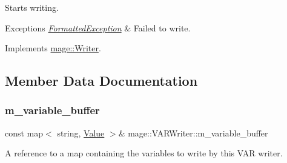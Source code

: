 Starts writing.


\begin{DoxyExceptions}{Exceptions}
{\em \hyperlink{classmage_1_1_formatted_exception}{Formatted\+Exception}} & Failed to write. \\
\hline
\end{DoxyExceptions}


Implements \hyperlink{classmage_1_1_writer_a9baf695ef7f6180bef883f60bcb3ac07}{mage\+::\+Writer}.



\subsection{Member Data Documentation}
\hypertarget{classmage_1_1_v_a_r_writer_ab8d7fcca1e09b0282a658ae92e405323}{}\label{classmage_1_1_v_a_r_writer_ab8d7fcca1e09b0282a658ae92e405323} 
\subsubsection{\texorpdfstring{m\+\_\+variable\+\_\+buffer}{m\_variable\_buffer}}
{\footnotesize\ttfamily const map$<$ string, \hyperlink{namespacemage_aa1fe0628487e0706e44efdc62dbdb3a2}{Value} $>$\& mage\+::\+V\+A\+R\+Writer\+::m\+\_\+variable\+\_\+buffer\hspace{0.3cm}{\ttfamily [private]}}

A reference to a map containing the variables to write by this V\+AR writer. 